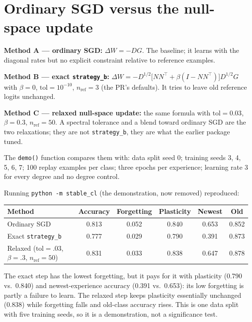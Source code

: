 \documentclass[11pt,a4paper]{article}
\newcommand{\code}[1]{\texttt{#1}}
\begin{document}
\section{Ordinary SGD versus the null-space update}\label{sec:demo}

\textbf{Method A --- ordinary SGD:} $\Delta W=-DG$. The baseline; it learns with the diagonal rates but no explicit constraint relative to reference examples.

\textbf{Method B --- exact \code{strategy\_b}:} $\Delta W=-D^{1/2}\bigl[NN^\top+\beta(I-NN^\top)\bigr]D^{1/2}G$ with $\beta=0$, $\text{tol}=10^{-10}$, $n_{\text{ref}}=3$ (the PR's defaults). It tries to leave old reference logits unchanged.

\textbf{Method C --- relaxed null-space update:} the same formula with $\text{tol}=0.03$, $\beta=0.3$, $n_{\text{ref}}=50$. A spectral tolerance and a blend toward ordinary SGD are the two relaxations; they are not \code{strategy\_b}, they are what the earlier package tuned.

The \code{demo()} function compares them with: data split seed 0; training seeds 3, 4, 5, 6, 7; 100 replay examples per class; three epochs per experience; learning rate 3 for every degree and no degree control.

\begin{verifybox}
Running \code{python -m stable\_cl} (the demonstration, now removed) reproduced:
\begin{center}\small
\begin{tabular}{@{}lccccc@{}}
\toprule
Method & Accuracy & Forgetting & Plasticity & Newest & Old\\
\midrule
Ordinary SGD & 0.813 & 0.052 & 0.840 & 0.653 & 0.852\\
Exact \code{strategy\_b} & 0.777 & 0.029 & 0.790 & 0.391 & 0.873\\
Relaxed ($\text{tol}=.03$, $\beta=.3$, $n_{\text{ref}}=50$) & 0.831 & 0.033 & 0.838 & 0.647 & 0.878\\
\bottomrule
\end{tabular}
\end{center}
The exact step has the lowest forgetting, but it pays for it with plasticity (0.790 vs.\ 0.840) and newest-experience accuracy (0.391 vs.\ 0.653): its low forgetting is partly a failure to learn. The relaxed step keeps plasticity essentially unchanged (0.838) while forgetting falls and old-class accuracy rises. This is one data split with five training seeds, so it is a demonstration, not a significance test.
\end{verifybox}
\end{document}
